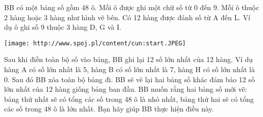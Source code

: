 BB có một bảng số gồm 48 ô. Mỗi ô được ghi một chữ số từ 0 đến 9. Mỗi ô thuộc 2 hàng hoặc 3 hàng như hình vẽ bên. Có 12 hàng được đánh số từ A đến L. Ví dụ ô ghi số 9 thuộc 3 hàng D, G và I.  


\texttt{[image: http://www.spoj.pl/content/cun:start.JPEG]}

   Sau khi điền toàn bộ số vào bảng, BB ghi lại 12 số lớn nhất của 12 hàng. Ví dụ hàng A có số lớn nhất là 5, hàng B có số lớn nhất là 7, hàng H có số lớn nhất là 0. Sau đó BB xóa toàn bộ bảng đi. BB sẽ vẽ lại hai bảng số khác đảm bảo 12 số lớn nhất của 12 hàng giống bảng ban đầu. BB muốn rằng hai bảng số mới vẽ: bảng thứ nhất sẽ có tổng các số trong 48 ô là nhỏ nhất, bảng thứ hai sẽ có tổng các số trong 48 ô là lớn nhất. Bạn hãy giúp BB thực hiện điều này.  

\